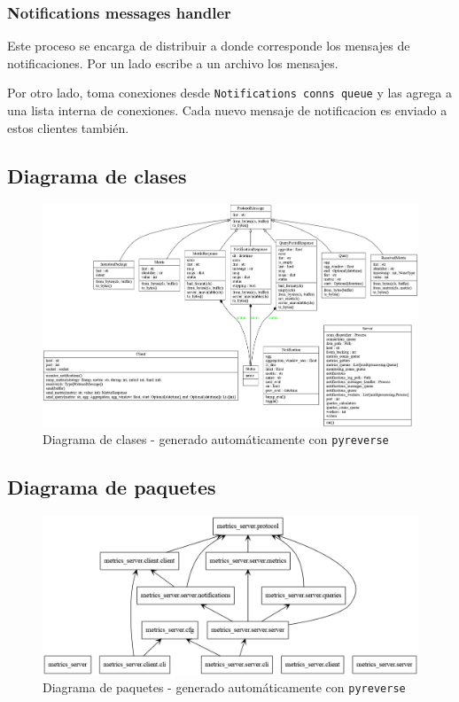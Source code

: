 \documentclass[a4paper,oneside]{article}
\begin{document}
\subsubsection{Notifications messages handler}
Este proceso se encarga de distribuir a donde corresponde los mensajes de notificaciones. Por un lado escribe a un archivo los mensajes.

Por otro lado, toma conexiones desde \texttt{Notifications conns queue} y las agrega a una lista interna de conexiones. Cada nuevo mensaje de notificacion es enviado a estos clientes también.

\subsection{Diagrama de clases}
\begin{figure}[H]
\centering
\includegraphics[width=\textwidth]{images/classes.png}
\caption{Diagrama de clases - generado automáticamente con \texttt{pyreverse}}
\end{figure}

\subsection{Diagrama de paquetes}
\begin{figure}[H]
\centering
\includegraphics[width=\textwidth]{images/packages.png}
\caption{Diagrama de paquetes - generado automáticamente con \texttt{pyreverse}}
\end{figure}
\end{document}
